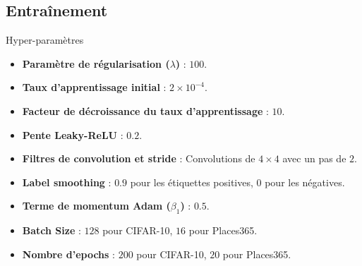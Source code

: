 \documentclass{beamer}
\begin{document}
\subsection{Entraînement}
\begin{frame}{Hyper-paramètres}
\begin{itemize}
    \item \color{red} \textbf{Paramètre de régularisation ($\lambda$)} : $100$. 
    \item \color{red} \textbf{Taux d'apprentissage initial} : $2 \times 10^{-4}$. 
    
    \item \color{black}\textbf{Facteur de décroissance du taux d'apprentissage} : $10$. 
    \item \textbf{Pente Leaky-ReLU} : $0.2$. 
    \item \textbf{Filtres de convolution et stride} : Convolutions de $4 \times 4$ avec un pas de $2$. 
    \item \textbf{Label smoothing} : $0.9$ pour les étiquettes positives, $0$ pour les négatives. 
    \item \textbf{Terme de momentum Adam ($\beta_1$)} : $0.5$. 
    \item \color{red}\textbf{Batch Size} : $128$ pour CIFAR-10, $16$ pour Places365.
    \item \color{red}\textbf{Nombre d'epochs} : $200$ pour CIFAR-10, $20$ pour Places365.
\end{itemize}
\end{frame}
\end{document}
